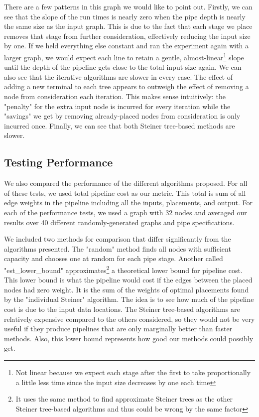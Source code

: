 \documentclass[conference]{IEEEtran}
\begin{document}
	There are a few patterns in this graph we would like to point out. Firstly, we can see that the slope of the run times is nearly zero when the pipe depth is nearly the same size as the input graph. This is due to the fact that each stage we place removes that stage from further consideration, effectively reducing the input size by one. If we held everything else constant and ran the experiment again with a larger graph, we would expect each line to retain a gentle, almost-linear\footnote{Not linear because we expect each stage after the first to take proportionally a little less time since the input size decreases by one each time} slope until the depth of the pipeline gets close to the total input size again.
	We can also see that the iterative algorithms are slower in every case. The effect of adding a new terminal to each tree appears to outweigh the effect of removing a node from consideration each iteration. This makes sense intuitively: the "penalty" for the extra input node is incurred for every iteration while the "savings" we get by removing already-placed nodes from consideration is only incurred once. Finally, we can see that both Steiner tree-based methods are slower.
	
	\subsection{Testing Performance}
	We also compared the performance of the different algorithms proposed. For all of these tests, we used total pipeline cost as our metric. This total is sum of all edge weights in the pipeline including all the inputs, placements, and output. For each of the performance tests, we used a graph with 32 nodes and averaged our results over 40 different randomly-generated graphs and pipe specifications.
	
	We included two methods for comparison that differ significantly from the algorithms presented. The "random" method finds all nodes with sufficient capacity and chooses one at random for each pipe stage. Another called "est\_lower\_bound" approximates\footnote{It uses the same method to find approximate Steiner trees as the other Steiner tree-based algorithms and thus could be wrong by the same factor} a theoretical lower bound for pipeline cost. This lower bound is what the pipeline would cost if the edges between the placed nodes had zero weight. It is the sum of the weights of optimal placements found by the "individual Steiner" algorithm. The idea is to see how much of the pipeline cost is due to the input data locations. The Steiner tree-based algorithms are relatively expensive compared to the others considered, so they would not be very useful if they produce pipelines that are only marginally better than faster methods. Also, this lower bound represents how good our methods could possibly get. 
	
\end{document}
